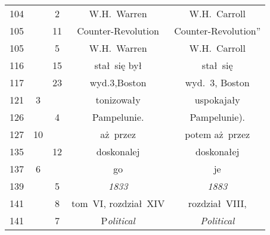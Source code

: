 \documentclass[a4paper,11pt]{article}
\numberwithin{equation}{section}
\begin{document}
\begin{center}
\begin{tabular}{|c|c|c|c|c|}
    104 & & \hphantom{0}2 & W.H.~Warren & W.H.~Carroll \\
    105 & & 11 & Counter-Revolution & Counter-Revolution” \\
    105 & & \hphantom{0}5 & W.H.~Warren & W.H.~Carroll \\
    116 & & 15 & stał~się był & stał~się \\
    117 & & 23 & wyd.3,Boston & wyd.~3, Boston \\
    121 & \hphantom{0}3 & & tonizowały & uspokajały \\
    126 & & \hphantom{0}4 & Pampelunie. & Pampelunie). \\
    127 & 10 & & aż~przez & potem aż~przez \\
    135 & & 12 & doskonalej & doskonałej \\
    137 & \hphantom{0}6 & & go & je \\
    139 & & \hphantom{0}5 & \textit{1833} & \textit{1883} \\
    141 & & \hphantom{0}8 & tom~VI, rozdział~XIV & rozdział~VIII, \\
    141 & & \hphantom{0}7 & P\textit{olitical} & \textit{Political} \\
    \hline
  \end{tabular}





  \newpage


\end{center}
\end{document}
